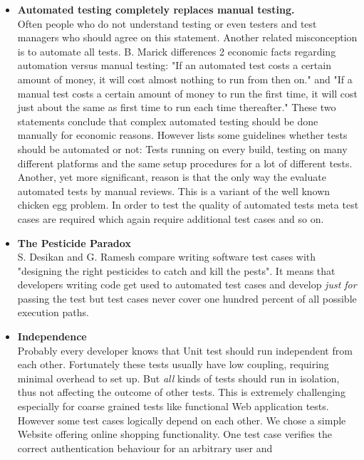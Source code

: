 \documentclass[12pt, notitlepage]{article}
\begin{document}
\begin{itemize}
	\item \textbf{Automated testing completely replaces manual testing.}\\
	Often people who do not understand testing or even testers and test managers who should agree on this statement. Another related misconception 
	is to automate all tests. B. Marick\cite{testing-mistakes} differences 2 economic facts regarding automation versus manual testing:
	"If an automated test costs a certain amount of money, it will cost almost nothing to run from then on." and
	"If a manual test costs a certain amount of money to run the first time, it will cost just about the same as first time to run each time thereafter."
	These two statements conclude that complex automated testing should be done manually for economic reasons.
	However \cite{test-automation-success} lists some guidelines whether tests should be automated or not: Tests running on every build,
	testing on many different platforms and the same setup procedures for a lot of different tests. \\
	Another, yet more significant, reason is that the only way the evaluate automated tests by manual reviews. This is a variant of the well known
	chicken egg problem. In order to test the quality of automated tests meta test cases are required which again require additional test cases and so on.
	\item \textbf{The Pesticide Paradox}\\
	S. Desikan and G. Ramesh\cite{softare-testing-principles} compare writing software test cases with "designing the right pesticides to catch and kill the pests".
	It means that developers writing code get used to automated test cases and develop \textit{just for} passing the test but test cases never cover one hundred 
	percent of all possible execution paths. 
	\item \textbf{Independence}\\
	Probably every developer knows that Unit test should run independent from each other. Fortunately these tests usually have low coupling, requiring minimal
	overhead to set up. But \textit{all} kinds of tests should run in isolation, thus not affecting the outcome of other tests.
	This is extremely challenging especially for coarse grained tests like functional Web application tests. However some test cases logically depend on each other.
	We chose a simple Website offering online shopping functionality. One test case verifies the correct authentication behaviour for an arbitrary user and

\end{itemize}
\end{document}

